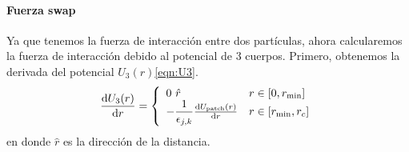 \documentclass[../main.tex]{subfiles}
\begin{document}

\paragraph{Fuerza swap} Ya que tenemos la fuerza de interacción entre dos partículas, ahora calcularemos la fuerza de interacción debido al potencial de 3 cuerpos.
Primero, obtenemos la derivada del potencial \(U_3(r)\)\eqref{eqn:U3}.
\begin{gather*}
    \dv{U_{3}\qty(r)}{r} =
    \left\{
    \begin{array}{ll}
        0~\hat{r} & r\in\qty[0,r_{\min}] \\
        -\dfrac{1}{\epsilon_{j,k}}\dv{U_{\mathrm{patch}}(r)}{r} & r\in\qty[r_{\min},r_c]
    \end{array}
    \right.
\end{gather*}
en donde \(\hat{r}\) es la dirección de la distancia.
\end{document}
